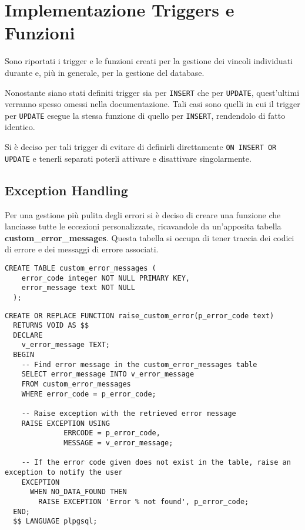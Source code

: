 \chapter{Implementazione Triggers e Funzioni}

Sono riportati i trigger e le funzioni creati per la gestione dei vincoli individuati durante  e, più in generale, per la gestione del database.

Nonostante siano stati definiti trigger sia per \lstinline{INSERT} che per \lstinline{UPDATE}, quest'ultimi verranno spesso omessi nella documentazione. Tali casi sono quelli in cui il trigger per \lstinline{UPDATE} esegue la stessa funzione di quello per \lstinline{INSERT}, rendendolo di fatto identico.

Si è deciso per tali trigger di evitare di definirli direttamente \lstinline{ON INSERT OR UPDATE} e tenerli separati poterli attivare e disattivare singolarmente.

\section{Exception Handling}

Per una gestione più pulita degli errori si è deciso di creare una funzione che lanciasse tutte le eccezioni personalizzate, ricavandole da un'apposita tabella \textbf{custom\_error\_messages}.
Questa tabella si occupa di tener traccia dei codici di errore e dei messaggi di errore associati.

\begin{lstlisting}[caption={Creazione della tabella \textbf{custom\_error\_messages}}]
  CREATE TABLE custom_error_messages (
    error_code integer NOT NULL PRIMARY KEY,
    error_message text NOT NULL
  );
\end{lstlisting}

\begin{lstlisting}[caption={Creazione della funzione per gestire le eccezioni}]
  CREATE OR REPLACE FUNCTION raise_custom_error(p_error_code text)
  RETURNS VOID AS $$
  DECLARE
    v_error_message TEXT;
  BEGIN
    -- Find error message in the custom_error_messages table 
    SELECT error_message INTO v_error_message
    FROM custom_error_messages
    WHERE error_code = p_error_code;
  
    -- Raise exception with the retrieved error message
    RAISE EXCEPTION USING 
              ERRCODE = p_error_code, 
              MESSAGE = v_error_message;
    
    -- If the error code given does not exist in the table, raise an exception to notify the user
    EXCEPTION
      WHEN NO_DATA_FOUND THEN
        RAISE EXCEPTION 'Error % not found', p_error_code;
  END;
  $$ LANGUAGE plpgsql;
\end{lstlisting}



